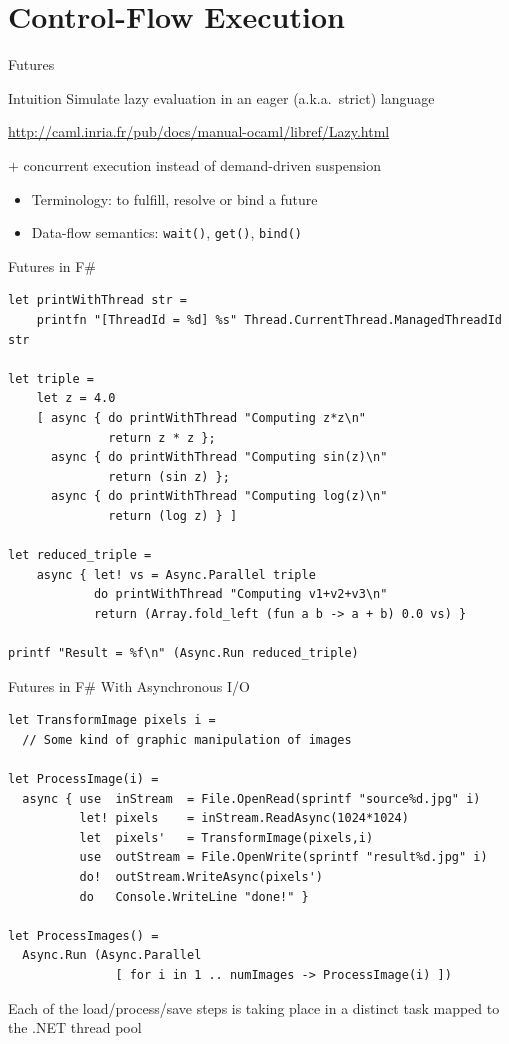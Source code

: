 \documentclass[xcolor=dvipsnames,9pt,mathserif]{beamer}
\renewcommand{\emph}[1]{\alert{#1}}
\begin{document}
\section{Control-Flow Execution}

\begin{frame}{Futures}
  \begin{block}{Intuition}
    Simulate \emph{lazy evaluation} in an eager (a.k.a.\ strict) language

    \url{http://caml.inria.fr/pub/docs/manual-ocaml/libref/Lazy.html}

    \bigskip
    $+$ \emph{concurrent execution} instead of demand-driven suspension
  \end{block}

  \begin{itemize}
  \item Terminology: to \emph{fulfill}, \emph{resolve} or \emph{bind} a future
  \item Data-flow semantics: \texttt{wait()}, \texttt{get()}, \texttt{bind()}
  \end{itemize}
\end{frame}

\begin{frame}[fragile]{Futures in F\#}
  \begin{lstlisting}
let printWithThread str =
    printfn "[ThreadId = %d] %s" Thread.CurrentThread.ManagedThreadId str
    
let triple =
    let z = 4.0
    [ async { do printWithThread "Computing z*z\n"
              return z * z };
      async { do printWithThread "Computing sin(z)\n"
              return (sin z) };
      async { do printWithThread "Computing log(z)\n"
              return (log z) } ]

let reduced_triple =
    async { let! vs = Async.Parallel triple
            do printWithThread "Computing v1+v2+v3\n"
            return (Array.fold_left (fun a b -> a + b) 0.0 vs) }

printf "Result = %f\n" (Async.Run reduced_triple)
  \end{lstlisting}
\end{frame}

\begin{frame}[fragile]{Futures in F\# With Asynchronous I/O}
  \begin{lstlisting}
let TransformImage pixels i =
  // Some kind of graphic manipulation of images

let ProcessImage(i) =
  async { use  inStream  = File.OpenRead(sprintf "source%d.jpg" i)
          let! pixels    = inStream.ReadAsync(1024*1024)
          let  pixels'   = TransformImage(pixels,i)
          use  outStream = File.OpenWrite(sprintf "result%d.jpg" i)
          do!  outStream.WriteAsync(pixels')
          do   Console.WriteLine "done!" }

let ProcessImages() =
  Async.Run (Async.Parallel 
               [ for i in 1 .. numImages -> ProcessImage(i) ])
  \end{lstlisting}

  \medskip
  Each of the load/process/save steps is taking place in a distinct
  task mapped to the .NET thread pool
\end{frame}
\end{document}
